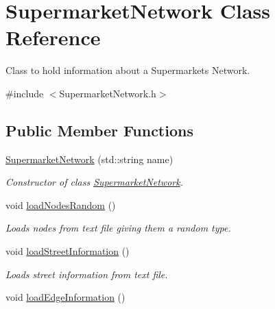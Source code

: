 \hypertarget{class_supermarket_network}{}\section{Supermarket\+Network Class Reference}
\label{class_supermarket_network}


Class to hold information about a Supermarket\textquotesingle{}s Network.  




{\ttfamily \#include $<$Supermarket\+Network.\+h$>$}

\subsection*{Public Member Functions}
\begin{DoxyCompactItemize}
\item 
\hyperlink{class_supermarket_network_afb289463b6137986f5ad6c26075c2f54}{Supermarket\+Network} (std\+::string name)
\begin{DoxyCompactList}\small\item\em Constructor of class \hyperlink{class_supermarket_network}{Supermarket\+Network}. \end{DoxyCompactList}\item 
\hypertarget{class_supermarket_network_a5e78cc11db3abd4fda6101277f9ba113}{}\label{class_supermarket_network_a5e78cc11db3abd4fda6101277f9ba113} 
void \hyperlink{class_supermarket_network_a5e78cc11db3abd4fda6101277f9ba113}{load\+Nodes\+Random} ()
\begin{DoxyCompactList}\small\item\em Loads nodes from text file giving them a random type. \end{DoxyCompactList}\item 
\hypertarget{class_supermarket_network_aafdd6da018ee4e8b04a1ede7f24dc5a8}{}\label{class_supermarket_network_aafdd6da018ee4e8b04a1ede7f24dc5a8} 
void \hyperlink{class_supermarket_network_aafdd6da018ee4e8b04a1ede7f24dc5a8}{load\+Street\+Information} ()
\begin{DoxyCompactList}\small\item\em Loads street information from text file. \end{DoxyCompactList}\item 
\hypertarget{class_supermarket_network_ada2b7550c41f37122396adfa66f96031}{}\label{class_supermarket_network_ada2b7550c41f37122396adfa66f96031} 
void \hyperlink{class_supermarket_network_ada2b7550c41f37122396adfa66f96031}{load\+Edge\+Information} ()

\end{DoxyCompactItemize}
